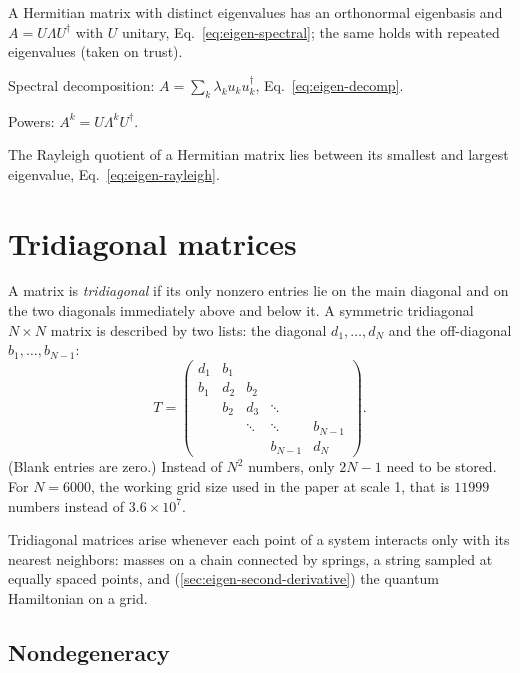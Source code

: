 \begin{keyideas}
\item A Hermitian matrix with distinct eigenvalues has an orthonormal eigenbasis and $A=U\Lambda U^\dagger$ with $U$ unitary, Eq.~\eqref{eq:eigen-spectral}; the same holds with repeated eigenvalues (taken on trust).
\item Spectral decomposition: $A=\sum_k\lambda_ku_ku_k^\dagger$, Eq.~\eqref{eq:eigen-decomp}.
\item Powers: $A^k=U\Lambda^kU^\dagger$.
\item The Rayleigh quotient of a Hermitian matrix lies between its smallest and largest eigenvalue, Eq.~\eqref{eq:eigen-rayleigh}.
\end{keyideas}

\section{Tridiagonal matrices}\label{sec:eigen-tridiagonal}

A matrix is \emph{tridiagonal} if its only nonzero entries lie on the main diagonal and on the two diagonals immediately above and below it. A symmetric tridiagonal $N\times N$ matrix is described by two lists: the diagonal $d_1,\dots,d_N$ and the off-diagonal $b_1,\dots,b_{N-1}$:
\begin{equation}
T=\begin{pmatrix}
d_1&b_1&&&\\
b_1&d_2&b_2&&\\
&b_2&d_3&\ddots&\\
&&\ddots&\ddots&b_{N-1}\\
&&&b_{N-1}&d_N
\end{pmatrix}.
\label{eq:eigen-tridiag}
\end{equation}
(Blank entries are zero.) Instead of $N^2$ numbers, only $2N-1$ need to be stored. For $N=6000$, the working grid size used in the paper at scale 1, that is $11999$ numbers instead of $3.6\times10^7$.

Tridiagonal matrices arise whenever each point of a system interacts only with its nearest neighbors: masses on a chain connected by springs, a string sampled at equally spaced points, and (\cref{sec:eigen-second-derivative}) the quantum Hamiltonian on a grid.

\subsection{Nondegeneracy}

